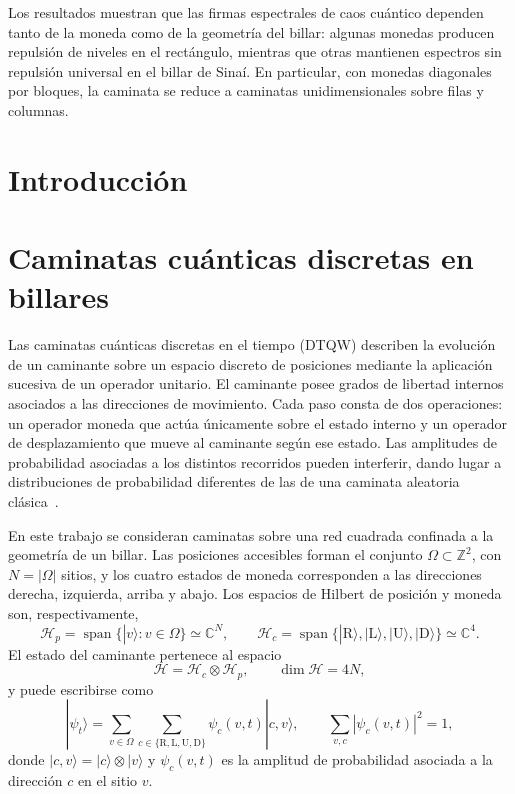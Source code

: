 \documentclass[12pt,a4paper,oneside]{report} %
\begin{document}
Los resultados muestran que las firmas espectrales de caos cuántico dependen tanto de la moneda como de la geometría del billar: algunas monedas producen repulsión de niveles en el rectángulo, mientras que otras mantienen espectros sin repulsión universal en el billar de Sinaí. En particular, con monedas diagonales por bloques, la caminata se reduce a caminatas unidimensionales sobre filas y columnas.

\clearpage

\tableofcontents

\clearpage
{}
\chapter{Introducción} %

\chapter{Caminatas cuánticas discretas en billares} %

Las caminatas cuánticas discretas en el tiempo (DTQW) describen la evolución de un caminante sobre un espacio discreto de posiciones mediante la aplicación sucesiva de un operador unitario. El caminante posee grados de libertad internos asociados a las direcciones de movimiento. Cada paso consta de dos operaciones: un operador moneda que actúa únicamente sobre el estado interno y un operador de desplazamiento que mueve al caminante según ese estado. Las amplitudes de probabilidad asociadas a los distintos recorridos pueden interferir, dando lugar a distribuciones de probabilidad diferentes de las de una caminata aleatoria clásica~\cite{aharonov2001quantum}.

En este trabajo se consideran caminatas sobre una red cuadrada confinada a la geometría de un billar. Las posiciones accesibles forman el conjunto $\Omega\subset\mathbb Z^2$, con $N=|\Omega|$ sitios, y los cuatro estados de moneda corresponden a las direcciones derecha, izquierda, arriba y abajo. Los espacios de Hilbert de posición y moneda son, respectivamente,
\begin{equation}
  \mathcal H_p
  = \operatorname{span}\{|v\rangle : v\in\Omega\}
  \simeq \mathbb C^N,
  \qquad
  \mathcal H_c
  = \operatorname{span}\{|\mathrm{R}\rangle,|\mathrm{L}\rangle,|\mathrm{U}\rangle,|\mathrm{D}\rangle\}
  \simeq \mathbb C^4.
\end{equation}
El estado del caminante pertenece al espacio
\begin{equation}
  \mathcal H = \mathcal H_c\otimes\mathcal H_p,
  \qquad \dim\mathcal H=4N,
\end{equation}
y puede escribirse como
\begin{equation}
  |\psi_t\rangle
  = \sum_{v\in\Omega}\sum_{c\in\{\mathrm{R},\mathrm{L},\mathrm{U},\mathrm{D}\}}
    \psi_c(v,t)|c,v\rangle,
  \qquad
  \sum_{v,c}|\psi_c(v,t)|^2=1,
\end{equation}
donde $|c,v\rangle=|c\rangle\otimes|v\rangle$ y $\psi_c(v,t)$ es la amplitud de probabilidad asociada a la dirección $c$ en el sitio $v$.
\end{document}
